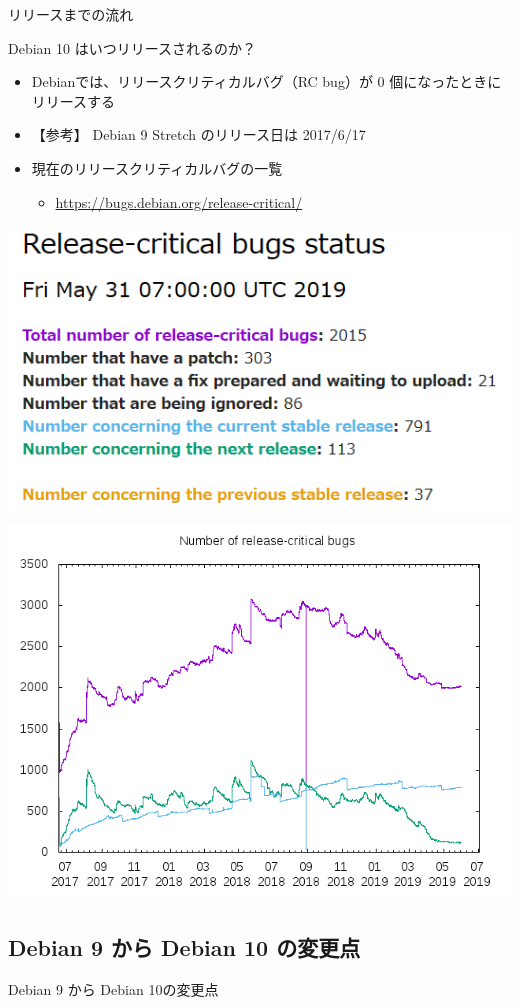 \begin{frame}{リリースまでの流れ}%

Debian 10 はいつリリースされるのか？

\begin{itemize}
\item Debianでは、リリースクリティカルバグ（RC bug）が 0 個になったときにリリースする
\item 【参考】 Debian 9 Stretch のリリース日は 2017/6/17
\item 現在のリリースクリティカルバグの一覧
  \begin{itemize}
  \item \url{https://bugs.debian.org/release-critical/}
  \end{itemize}
\end{itemize}

\begin{center}
  \includegraphics[width=0.45\hsize]{image201906/debian-rcbug-1_20190531.png}
  \includegraphics[width=0.45\hsize]{image201906/debian-rcbug-2_20190531.png}
\end{center}

\end{frame}


\subsection{Debian 9 から Debian 10 の変更点}

\begin{frame}
  \begin{center}\Huge{Debian 9 から Debian 10の変更点}\end{center}
\end{frame}


